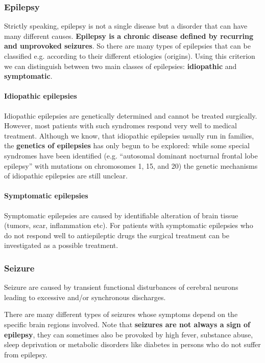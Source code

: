 \documentclass[12pt,article,oneside,a4paper]{memoir}
\begin{document}
\subsubsection{Epilepsy}
Strictly speaking, epilepsy is not a single disease but a disorder that can
have many different causes. \textbf{Epilepsy is a chronic disease defined by
recurring and unprovoked seizures}.
So there are many types of epilepsies that can be classified e.g. according to
their different etiologies (origins). Using this criterion we can distinguish
between two main classes of epilepsies: \textbf{idiopathic} and
\textbf{symptomatic}.

\paragraph{Idiopathic epilepsies}
Idiopathic epilepsies are genetically determined and cannot be treated
surgically. However, most patients with such syndromes respond very well to
medical treatment.
Although we know, that idiopathic epilepsies usually run in families, the
\textbf{genetics of epilepsies} has only begun to be explored: while some
special syndromes have been identified (e.g. ``autosomal dominant nocturnal
frontal lobe epilepsy'' with mutations on chromosomes 1, 15, and 20) the
genetic mechanisms of idiopathic epilepsies are still unclear.

\paragraph{Symptomatic epilepsies}
Symptomatic epilepsies are caused by identifiable alteration of brain tissue
(tumors, scar, inflammation etc). For patients with symptomatic epilepsies who
do not respond well to antiepileptic drugs the surgical treatment can be
investigated as a possible treatment.

\subsubsection{Seizure}
Seizure are caused by transient functional disturbances of cerebral neurons
leading to excessive and/or synchronous discharges.

There are many different types of seizures whose symptoms depend on the
specific brain regions involved. 
Note that \textbf{seizures are not always a sign of epilepsy}, they can
sometimes also be provoked by high fever, substance abuse, sleep deprivation or
metabolic disorders like diabetes in persons who do not suffer from epilepsy.
\end{document}

